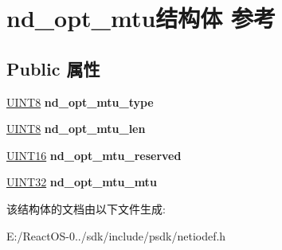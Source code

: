 \hypertarget{structnd__opt__mtu}{}\section{nd\+\_\+opt\+\_\+mtu结构体 参考}
\label{structnd__opt__mtu}
\subsection*{Public 属性}
\begin{DoxyCompactItemize}
\item 
\mbox{\label{structnd__opt__mtu_a3ba37c56642c7dd57a2c9b85f983dfb5}} 
\hyperlink{_processor_bind_8h_ab27e9918b538ce9d8ca692479b375b6a}{U\+I\+N\+T8} {\bfseries nd\+\_\+opt\+\_\+mtu\+\_\+type}
\item 
\mbox{\label{structnd__opt__mtu_ab20ee8f3450de23bebc6dfc4cc69cf43}} 
\hyperlink{_processor_bind_8h_ab27e9918b538ce9d8ca692479b375b6a}{U\+I\+N\+T8} {\bfseries nd\+\_\+opt\+\_\+mtu\+\_\+len}
\item 
\mbox{\label{structnd__opt__mtu_afaed42df5f55dad4201d3ddb1049d1b1}} 
\hyperlink{_processor_bind_8h_a09f1a1fb2293e33483cc8d44aefb1eb1}{U\+I\+N\+T16} {\bfseries nd\+\_\+opt\+\_\+mtu\+\_\+reserved}
\item 
\mbox{\label{structnd__opt__mtu_a01e25277633b3b6014c52c92c0ea1a2c}} 
\hyperlink{_processor_bind_8h_ae1e6edbbc26d6fbc71a90190d0266018}{U\+I\+N\+T32} {\bfseries nd\+\_\+opt\+\_\+mtu\+\_\+mtu}
\end{DoxyCompactItemize}


该结构体的文档由以下文件生成\+:\begin{DoxyCompactItemize}
\item 
E\+:/\+React\+O\+S-\/0../sdk/include/psdk/netiodef.\+h\end{DoxyCompactItemize}
